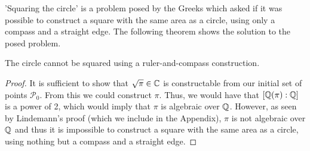 'Squaring the circle' is a problem posed by the Greeks which asked if it was possible to construct a square with the same area as a circle, using only a compass and a straight edge. The following theorem shows the solution to the posed problem.

\begin{theorem}
    The circle cannot be squared using a ruler-and-compass construction.
\end{theorem}

\begin{proof}  
    
    It is sufficient to show that $\sqrt{\pi}\in \mathbb C$ is constructable from our initial set of points $\mathcal{P}_0$. From this we could construct $\pi$. Thus, we would have that $[\mathbb Q(\pi):\mathbb Q]$ is a power of 2, which would imply that $\pi$ is algebraic over $\mathbb Q$. However, as seen by Lindemann's proof (which we include in the Appendix), $\pi$ is not algebraic over $\mathbb Q$ and thus it is impossible to construct a square with the same area as a circle, using nothing but a compass and a straight edge.
\end{proof}
